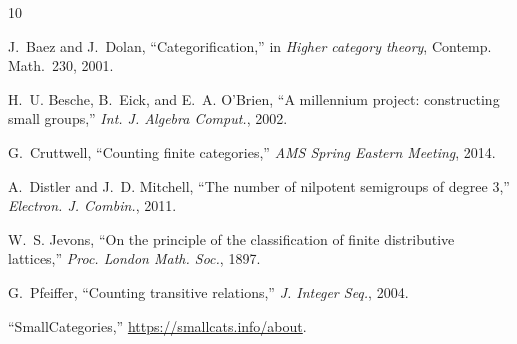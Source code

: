 \documentclass[12pt,a4paper]{amsart}
\theoremstyle{definition}
\theoremstyle{remark}
\begin{document}
\begin{thebibliography}{10}

J.~Baez and J.~Dolan, ``Categorification,'' in \emph{Higher category
  theory}, Contemp. Math.~230, 2001.

H.~U. Besche, B.~Eick, and E.~A. O'Brien, ``A millennium project:
  constructing small groups,'' \emph{Int. J. Algebra Comput.}, 2002.

G.~Cruttwell, ``Counting finite categories,'' \emph{AMS Spring Eastern
  Meeting}, 2014.

A.~Distler and J.~D. Mitchell, ``The number of nilpotent semigroups of
  degree $3$,'' \emph{Electron. J. Combin.}, 2011.

W.~S. Jevons, ``On the principle of the classification of finite
  distributive lattices,'' \emph{Proc. London Math. Soc.}, 1897.

G.~Pfeiffer, ``Counting transitive relations,'' \emph{J. Integer Seq.},
  2004.

``SmallCategories,'' \url{https://smallcats.info/about}.

\end{thebibliography}
\end{document}

